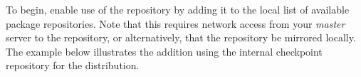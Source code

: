 To begin, enable use of the \FSP{} repository by adding it to the local list of
available package repositories.  Note that this requires network access from
your {\em master} server to the \FSP{} repository, or alternatively, that
the \FSP{} repository be mirrored locally. The example below illustrates the addition
using the internal \FSP{} checkpoint repository for the \baseOS{} distribution.

